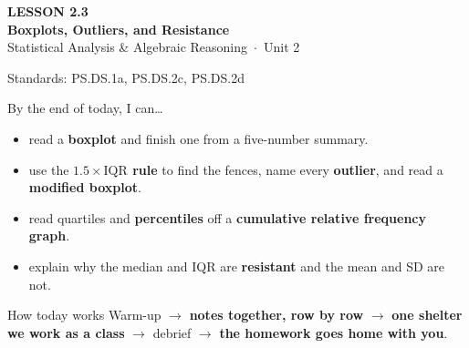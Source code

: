 \documentclass[aspectratio=169, 11pt]{beamer}
\begin{document}
{
\begin{frame}[plain]
  \vspace{2.8cm}\hspace{0.55cm}%
  \begin{minipage}{0.9\textwidth}
    {\color{goldacc}\bfseries\small LESSON 2.3}\\[0.5cm]
    {\color{white}\bfseries\LARGE Boxplots, Outliers, and Resistance}\\[1.2cm]
    {\color{frostmid}\small Statistical Analysis \& Algebraic Reasoning~$\cdot$~Unit 2}
  \end{minipage}
\end{frame}
}

\begin{frame}[t, plain]
  {\footnotesize\color{slate} Standards: PS.DS.1a, PS.DS.2c, PS.DS.2d}\par\smallskip
  By the end of today, I can\ldots
  \begin{itemize}\setlength{\itemsep}{3pt}
    \item read a \textbf{boxplot} and finish one from a five-number summary.
    \item use the \textbf{$1.5 \times \text{IQR}$ rule} to find the fences, name every
          \textbf{outlier}, and read a \textbf{modified boxplot}.
    \item read quartiles and \textbf{percentiles} off a \textbf{cumulative relative frequency
          graph}.
    \item explain why the median and IQR are \textbf{resistant} and the mean and SD are not.
  \end{itemize}
  \begin{block}{How today works}
    Warm-up $\to$ \textbf{notes together, row by row} $\to$ \textbf{one shelter we work as a
    class} $\to$ debrief $\to$ \textbf{the homework goes home with you}.
  \end{block}
\end{frame}
\end{document}

